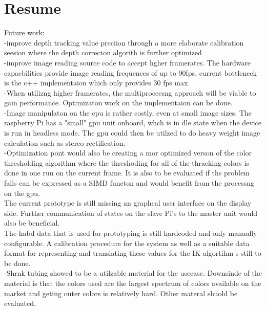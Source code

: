 \chapter{Resume}

Future work:\\
-improve depth tracking value preciion through a more elaborate calibration seesion where the depth correcton algorith is further optimized
\\
-improve image reading source code to accept hgher framerates. The hardware capacbilities provide image reading frequences of up to 90fps, current bottleneck is the c++ implementaion which only provides 30 fps max.
\\
-When utilizng higher framerates, the multiproceesng approach will be viable to gain performance. Optimizaton work on the implementaion can be done.\\
-Image manipulaton on the cpu is rather costly, even at small image sizes. The raspberry Pi has a "small" gpu unit onboard, whch is in dle state when the device is run in headless mode. The gpu could then be utilzed to do heavy weight image calculation such as stereo rectification.\\
-Optimization pont would also be creating a mor optimized verson of the color thresholding algorithm where the threshoding for all of the thracking colors is done in one run on the current frame. It is also to be evaluated if ths problem falls can be expressed as a SIMD functon and would benefit from the processng on the gpu.
\\
The current prototype is still missing an graphcal user interface on the display side. Further communication of states on the slave Pi's to the master unit would also be beneficial.
\\
The habd data that is used for prototyping is still hardcoded and only manually configurable. A calibration procedure for the system as well as a suitable data format for representing and translating these values for the IK algortihm s still to be done.
\\
-Shrnk tubing showed to be a utilzable material for the usecase. Downsinde of the material is that the colors used are the largest spectrum of colors available on the market and geting outer colors is relatively hard. Other materal shuold be evaluated.
